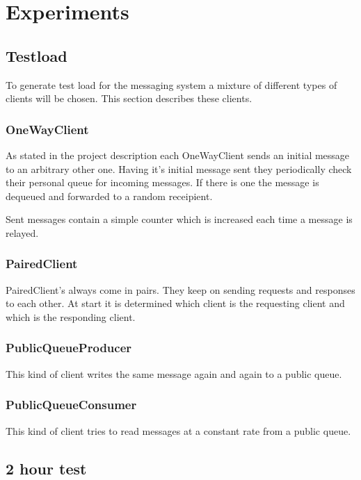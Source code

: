 \documentclass[milestone1.tex]{subfiles}
\begin{document}
\section{Experiments}

\subsection{Testload}
To generate test load for the messaging system a mixture of different types of clients will be chosen. This section describes these clients.

\subsubsection{OneWayClient}
As stated in the project description each OneWayClient sends an initial message to an arbitrary other one. Having it's initial message sent they periodically check their personal queue for incoming messages. If there is one the message is dequeued and forwarded to a random receipient.

Sent messages contain a simple counter which is increased each time a message is relayed.

\subsubsection{PairedClient}
PairedClient's always come in pairs. They keep on sending requests and responses to each other. At start it is determined which client is the requesting client and which is the responding client.

\subsubsection{PublicQueueProducer}
This kind of client writes the same message again and again to a public queue.

\subsubsection{PublicQueueConsumer}
This kind of client tries to read messages at a constant rate from a public queue.

\subsection{2 hour test}
\end{document}
